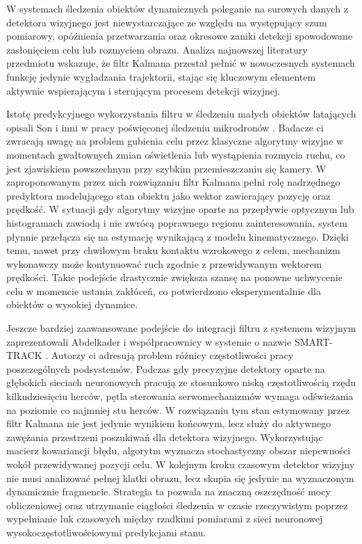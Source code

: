 \documentclass[a4paper,twoside,12pt]{book}
\begin{document}
W systemach śledzenia obiektów dynamicznych poleganie na surowych danych z detektora wizyjnego jest niewystarczające ze względu na występujący szum pomiarowy, opóźnienia przetwarzania oraz okresowe zaniki detekcji spowodowane zasłonięciem celu lub rozmyciem obrazu. Analiza najnowszej literatury przedmiotu wskazuje, że filtr Kalmana przestał pełnić w nowoczesnych systemach funkcję jedynie wygładzania trajektorii, stając się kluczowym elementem aktywnie wspierającym i sterującym procesem detekcji wizyjnej.

Istotę predykcyjnego wykorzystania filtru w śledzeniu małych obiektów latających opisali Son i inni w pracy poświęconej śledzeniu mikrodronów \cite{bib:Son2021}. Badacze ci zwracają uwagę na problem gubienia celu przez klasyczne algorytmy wizyjne w momentach gwałtownych zmian oświetlenia lub wystąpienia rozmycia ruchu, co jest zjawiskiem powszechnym przy szybkim przemieszczaniu się kamery. W zaproponowanym przez nich rozwiązaniu filtr Kalmana pełni rolę nadrzędnego predyktora modelującego stan obiektu jako wektor zawierający pozycję oraz prędkość. W sytuacji gdy algorytmy wizyjne oparte na przepływie optycznym lub histogramach zawiodą i nie zwrócą poprawnego regionu zainteresowania, system płynnie przełącza się na estymację wynikającą z modelu kinematycznego. Dzięki temu, nawet przy chwilowym braku kontaktu wzrokowego z celem, mechanizm wykonawczy może kontynuować ruch zgodnie z przewidywanym wektorem prędkości. Takie podejście drastycznie zwiększa szansę na ponowne uchwycenie celu w momencie ustania zakłóceń, co potwierdzono eksperymentalnie dla obiektów o wysokiej dynamice.

Jeszcze bardziej zaawansowane podejście do integracji filtru z systemem wizyjnym zaprezentowali Abdelkader i współpracownicy w systemie o nazwie SMART-TRACK \cite{bib:Abdelkader2025}. Autorzy ci adresują problem różnicy częstotliwości pracy poszczególnych podsystemów. Podczas gdy precyzyjne detektory oparte na głębokich sieciach neuronowych pracują ze stosunkowo niską częstotliwością rzędu kilkudziesięciu herców, pętla sterowania serwomechanizmów wymaga odświeżania na poziomie co najmniej stu herców. W rozwiązaniu tym stan estymowany przez filtr Kalmana nie jest jedynie wynikiem końcowym, lecz służy do aktywnego zawężania przestrzeni poszukiwań dla detektora wizyjnego. Wykorzystując macierz kowariancji błędu, algorytm wyznacza stochastyczny obszar niepewności wokół przewidywanej pozycji celu. W kolejnym kroku czasowym detektor wizyjny nie musi analizować pełnej klatki obrazu, lecz skupia się jedynie na wyznaczonym dynamicznie fragmencie. Strategia ta pozwala na znaczną oszczędność mocy obliczeniowej oraz utrzymanie ciągłości śledzenia w czasie rzeczywistym poprzez wypełnianie luk czasowych między rzadkimi pomiarami z sieci neuronowej wysokoczęstotliwościowymi predykcjami stanu.
\end{document}
